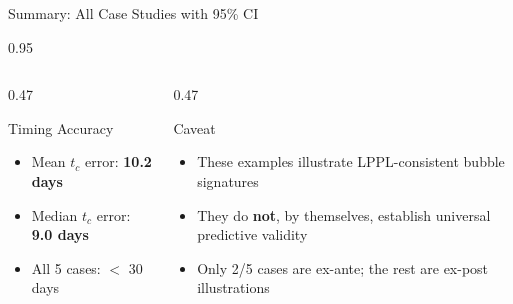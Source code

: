 \documentclass[9pt, aspectratio=169, t]{beamer}
\begin{document}
\begin{frame}{Summary: All Case Studies with 95\% CI}
\begin{cminipage}{0.95\textwidth}
{    \vspace{1mm}
    }
    {\footnotesize
    \begin{columns}[T]
        \begin{column}{0.47\textwidth}
            \begin{block}{Timing Accuracy}
                \begin{itemize}\setlength{\itemsep}{0pt}
                    \item Mean $t_c$ error: \textbf{10.2 days}
                    \item Median $t_c$ error: \textbf{9.0 days}
                    \item All 5 cases: $<$ 30 days
                \end{itemize}
            \end{block}
        \end{column}
        \begin{column}{0.47\textwidth}
            \begin{exampleblock}{Caveat}
                \begin{itemize}\setlength{\itemsep}{0pt}
                    \item These examples illustrate LPPL-consistent bubble signatures
                    \item They do \textbf{not}, by themselves, establish universal predictive validity
                    \item Only 2/5 cases are ex-ante; the rest are ex-post illustrations
                \end{itemize}
            \end{exampleblock}
        \end{column}
    \end{columns}
    }
    \end{cminipage}
\end{frame}

\end{document}
